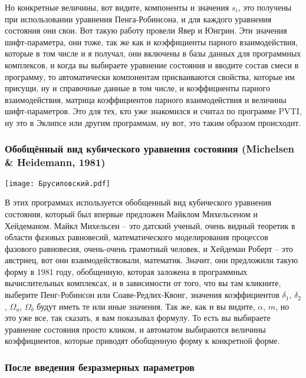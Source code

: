 \documentclass[main.tex]{subfiles}
\begin{document}
Но конкретные величины, вот видите, компоненты и значения $s_i$, это получены при использовании уравнения Пенга-Робинсона, и для каждого уравнения состояния они свои.
Вот такую работу провели Явер и Юнгрин.
Эти значения шифт-параметра, они тоже, так же как и коэффициенты парного взаимодействия, которые в том числе и я получал, они включены в базы данных для программных комплексов, и когда вы выбираете уравнение состояния и вводите состав смеси в программу, то автоматически компонентам присваиваются свойства, которые им присущи, ну и справочные данные в том числе, и коэффициенты парного взаимодействия, матрица коэффициентов парного взаимодействия и величины шифт-параметров.
Это для тех, кто уже знакомился и считал по программе PVTI, ну это в Эклипсе или другим программам, ну вот, это таким образом происходит.

\subsubsection{Обобщённый вид кубического уравнения состояния (Michelsen \& Heidemann, 1981)}

\begin{center}
\texttt{[image: Брусиловский.pdf]}
\end{center}

В этих программах используется обобщенный вид кубического уравнения состояния, который был впервые предложен Майклом Михельсеном и Хейдеманом.
Майкл Михельсен -- это датский ученый, очень видный теоретик в области фазовых равновесий, математического моделирования процессов фазового равновесия, очень-очень грамотный человек, и Хейдеман Роберт -- это австриец, вот они взаимодействовали, математик.
Значит, они предложили такую форму в 1981 году, обобщенную, которая заложена в программных вычислительных комплексах, и в зависимости от того, что вы там кликните, выберите Пенг-Робинсон или Соаве-Редлих-Квонг, значения коэффициентов $\delta_1$, $\delta_2$, $\Omega_a$, $\Omega_b$ будут иметь те или иные значения.
Так же, как и вы видите, $\alpha$, $m$, но это уже все, так сказать, я вам показывал формулу.
То есть вы выбираете уравнение состояния просто кликом, и автоматом выбираются величины коэффициентов, которые приводят обобщенную форму к конкретной форме.

\subsubsection{После введения безразмерных параметров}
\end{document}
